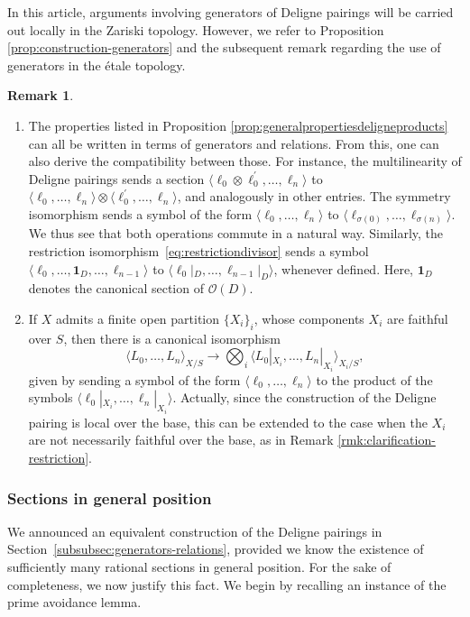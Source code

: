 \documentclass[11pt]{article}
\newcommand{\skpt}{\smallskip}
\theoremstyle{plain}
\theoremstyle{definition}
\newtheorem{remark}[theorem]{Remark}
\newcommand{\Ocal}{\mathcal O}
\begin{document}
In this article, arguments involving generators of Deligne pairings will be carried out locally in the Zariski topology. However, we refer to Proposition \ref{prop:construction-generators} and the subsequent remark regarding the use of generators in the étale topology.

\skpt
\begin{remark}
\begin{enumerate}
\item The properties listed in Proposition \ref{prop:generalpropertiesdeligneproducts} can all be written in terms of generators and relations. From this, one can also derive the compatibility between those. For instance, the multilinearity of Deligne pairings sends a section $\langle \ell_0\otimes\ell_{0}^{\prime}, \ldots, \ell_n \rangle $ to $\langle \ell_0, \ldots, \ell_n \rangle \otimes \langle \ell_0^{\prime}, \ldots, \ell_n \rangle$, and analogously in other entries. The symmetry isomorphism sends a symbol of the form $\langle \ell_0, \ldots, \ell_n \rangle $ to $\langle \ell_{\sigma(0)}, \ldots, \ell_{\sigma(n)} \rangle $. We thus see that both operations commute in a natural way. Similarly, the restriction isomorphism~\eqref{eq:restrictiondivisor} sends a symbol $\langle \ell_0, \ldots, \mathbf{1}_{D},\ldots, \ell_{n-1} \rangle$ to $\langle \ell_0 |_{D}, \ldots, \ell_{n-1} |_{D} \rangle$, whenever defined. Here, $\mathbf{1}_{D}$ denotes the canonical section of $\Ocal(D)$.
\item If $X$ admits a finite open partition $\lbrace X_{i}\rbrace_{i}$, whose components $X_{i}$ are faithful over $S$, then there is a canonical isomorphism
\begin{equation}\label{eq:decomposition-Deligne-pairing-partition}
\langle L_{0},\ldots, L_{n}\rangle_{X/S}\to\bigotimes_{i}\langle L_{0} |_{X_{i}},\ldots, L_{n} |_{X_{i}}\rangle_{X_{i}/S},
\end{equation}
given by sending a symbol of the form $\langle \ell_{0}, \ldots, \ell_{n} \rangle $ to the product of the symbols $\langle \ell_{0} |_{X_{i}}, \ldots, \ell_{n} |_{X_{i}} \rangle$. Actually, since the construction of the Deligne pairing is local over the base, this can be extended to the case when the $X_{i}$ are not necessarily faithful over the base, as in Remark \ref{rmk:clarification-restriction}.
\end{enumerate}
\end{remark}

\subsubsection{Sections in general position}\label{subsubsec:sections-general-position}
We announced an equivalent construction of the Deligne pairings in Section~\ref{subsubsec:generators-relations}, provided we know the existence of sufficiently many rational sections in general position. For the sake of completeness, we now justify this fact. We begin by recalling an instance of the prime avoidance lemma.
\end{document}
